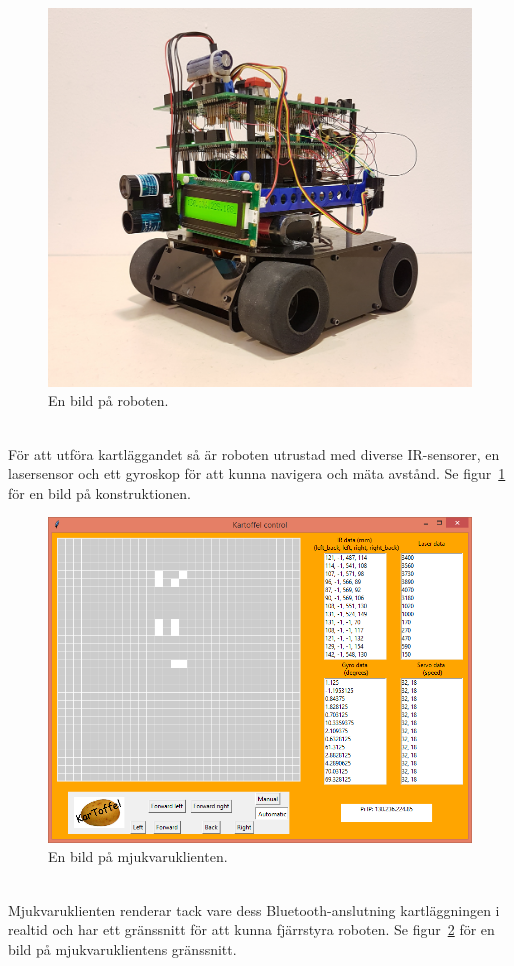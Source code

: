 \documentclass{article}
\begin{document}
\begin{figure}[H]
\centering
\includegraphics[scale=0.1]{robot_irl}
\caption{En bild på roboten.}
\label{fig:robot_bild}
\end{figure}
\ \\
För att utföra kartläggandet så är roboten utrustad med diverse IR-sensorer, en lasersensor och ett gyroskop för att kunna navigera och mäta avstånd. Se figur~\ref{fig:robot_bild} för en bild på konstruktionen.

\begin{figure}[H]
\centering
\includegraphics[scale=0.55]{client_interface}
\caption{En bild på mjukvaruklienten.}
\label{fig:klient_bild}
\end{figure}
\ \\
Mjukvaruklienten renderar tack vare dess Bluetooth-anslutning kartläggningen i realtid och har ett gränssnitt för att kunna fjärrstyra roboten. Se figur~\ref{fig:klient_bild} för en bild på mjukvaruklientens gränssnitt.
\end{document}
